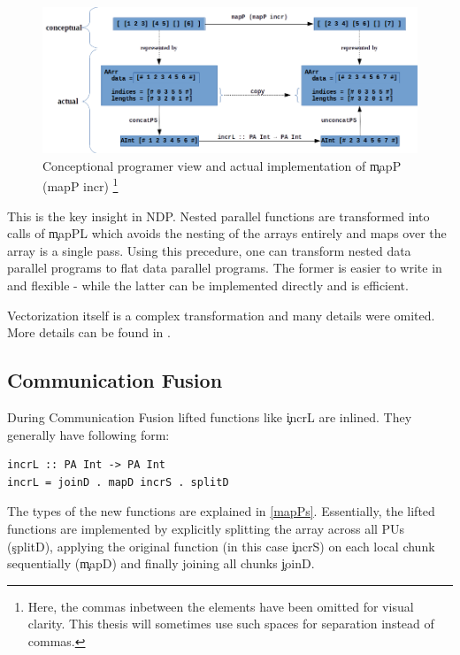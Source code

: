     \begin{figure}[h!]
        \begin{center}
        \includegraphics[width=\linewidth]{mapP.png}
        \caption{Conceptional programer view and actual implementation of \c{mapP (mapP incr)}
        \footnote{Here, the commas inbetween the elements have been omitted for visual clarity.
        This thesis will sometimes use such spaces for separation
        instead of commas.
        }
        }
        \label{figure:mapP}
        \end{center}
    \end{figure}
    
    This is the key insight in NDP. Nested parallel functions are
    transformed into calls of \c{mapPL} which avoids the nesting of
    the arrays entirely and maps over the array is a single pass.
    Using this precedure, one can transform nested data parallel programs
    to flat data parallel programs. The former is easier to write in and flexible
    - while the latter can be implemented directly and is efficient.
            
    Vectorization itself is a complex transformation and many details were omited.
    More details can be found in \cite{Harness2008}.
    
  \subsection{Communication Fusion}
    During Communication Fusion lifted functions like \c{incrL} are inlined.
    They generally have following form:
    \begin{lstlisting}
incrL :: PA Int -> PA Int
incrL = joinD . mapD incrS . splitD
    \end{lstlisting}
    The types of the new functions are explained in \ref{mapPs}.
    Essentially, the lifted functions are implemented by explicitly
    splitting the array across all PUs (\c{splitD}), applying the original
    function (in this case \c{incrS}) on each local chunk sequentially (\c{mapD})
    and finally joining all chunks {\c{joinD}}.
    
